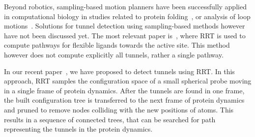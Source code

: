 \documentclass{llncs}
\begin{document}
Beyond robotics, sampling-based motion planners have been successfully applied in computational biology in studies
related to 
protein folding~\cite{al2012motion,gipson2012computational,cortes2010simulating,amato2002using,raveh2009rapid,novinskaya2015improving,songPFintro}, or analysis of loop motions~\cite{cortes2004geometric}.
Solutions for tunnel detection using sampling-based methods however have not been discussed yet.
The most relevant paper is~\cite{guieysse2008structure}, where RRT is used to compute pathways for flexible ligands towards 
the active site.
This method however does not compute explicitly all tunnels, rather a single pathway.

In our recent paper~\cite{vonasek2016application}, we have proposed to detect tunnels using RRT.
In this approach, RRT samples the configuration space of a small spherical probe moving in a single frame of protein dynamics.
After the tunnels are found in one frame, the built  configuration tree is transferred to the next frame of protein dynamics and pruned to remove
nodes colliding with the new positions of atoms.
This results in a sequence of connected trees, that can be searched for path representing the tunnels in the protein dynamics.

\end{document}
